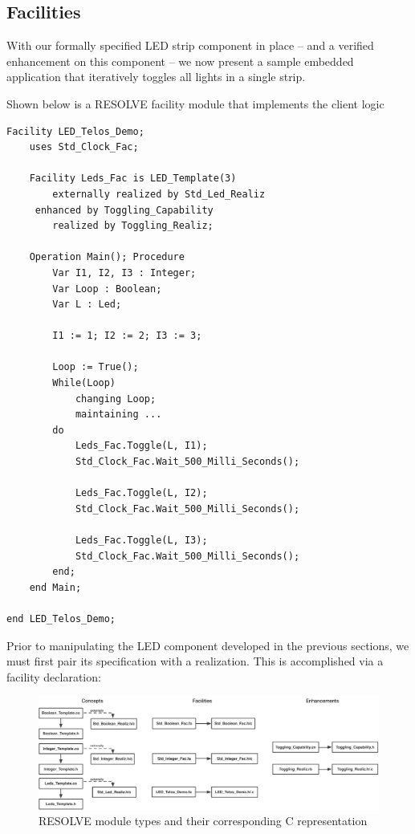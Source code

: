 \documentclass{sig-alternate}
\begin{document}
\subsection{Facilities}
\label{sec:facilities}

With our formally specified LED strip component in place -- and a verified enhancement on this component -- we now present a sample embedded application that iteratively toggles all lights in a single strip.

Shown below is a RESOLVE facility module that implements the client logic 
\begin{verbatim}
Facility LED_Telos_Demo;
    uses Std_Clock_Fac;
    
    Facility Leds_Fac is LED_Template(3)
        externally realized by Std_Led_Realiz
     enhanced by Toggling_Capability
        realized by Toggling_Realiz;
        
    Operation Main(); Procedure
        Var I1, I2, I3 : Integer;
        Var Loop : Boolean;
        Var L : Led;
        
        I1 := 1; I2 := 2; I3 := 3;
        
        Loop := True();
        While(Loop)
            changing Loop;
            maintaining ...
        do
            Leds_Fac.Toggle(L, I1);
            Std_Clock_Fac.Wait_500_Milli_Seconds();
            
            Leds_Fac.Toggle(L, I2);
            Std_Clock_Fac.Wait_500_Milli_Seconds();
            
            Leds_Fac.Toggle(L, I3);
            Std_Clock_Fac.Wait_500_Milli_Seconds();
        end;
    end Main;
    
end LED_Telos_Demo;
\end{verbatim}

Prior to manipulating the LED component developed in the previous sections, we must first pair its specification with a realization. This is accomplished via a facility declaration:


\begin{figure}[!htb]
\centering
\includegraphics[scale=.45]{figs/implementation.pdf}
\caption{RESOLVE module types and their corresponding C representation}
\end{figure}
\label{fig:imp}
\end{document}
